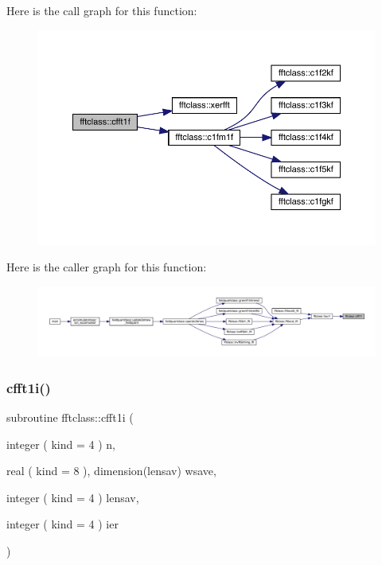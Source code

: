 Here is the call graph for this function\+:\nopagebreak
\begin{figure}[H]
\begin{center}
\leavevmode
\includegraphics[width=350pt]{namespacefftclass_a4cc16a9191f915424a42d281f821c291_cgraph}
\end{center}
\end{figure}
Here is the caller graph for this function\+:\nopagebreak
\begin{figure}[H]
\begin{center}
\leavevmode
\includegraphics[width=350pt]{namespacefftclass_a4cc16a9191f915424a42d281f821c291_icgraph}
\end{center}
\end{figure}
\mbox{\label{namespacefftclass_a7aaa42c1b45fc7175f2560cd023e4487}} 
\subsubsection{\texorpdfstring{cfft1i()}{cfft1i()}}
{\footnotesize\ttfamily subroutine fftclass\+::cfft1i (\begin{DoxyParamCaption}\item[{integer ( kind = 4 )}]{n,  }\item[{real ( kind = 8 ), dimension(lensav)}]{wsave,  }\item[{integer ( kind = 4 )}]{lensav,  }\item[{integer ( kind = 4 )}]{ier }\end{DoxyParamCaption})}

